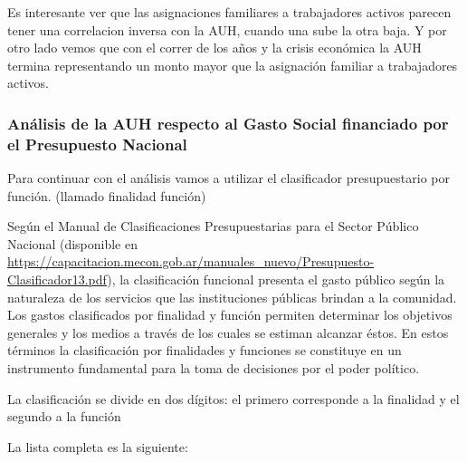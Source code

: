 \documentclass[
  12,
]{article}
\begin{document}
Es interesante ver que las asignaciones familiares a trabajadores
activos parecen tener una correlacion inversa con la AUH, cuando una
sube la otra baja. Y por otro lado vemos que con el correr de los años y
la crisis económica la AUH termina representando un monto mayor que la
asignación familiar a trabajadores activos.

\hypertarget{anuxe1lisis-de-la-auh-respecto-al-gasto-social-financiado-por-el-presupuesto-nacional}{%
\subsubsection{Análisis de la AUH respecto al Gasto Social financiado
por el Presupuesto
Nacional}\label{anuxe1lisis-de-la-auh-respecto-al-gasto-social-financiado-por-el-presupuesto-nacional}}

Para continuar con el análisis vamos a utilizar el clasificador
presupuestario por función. (llamado finalidad función)

Según el Manual de Clasificaciones Presupuestarias para el Sector
Público Nacional (disponible en
\url{https://capacitacion.mecon.gob.ar/manuales_nuevo/Presupuesto-Clasificador13.pdf}),
la clasificación funcional presenta el gasto público según la naturaleza
de los servicios que las instituciones públicas brindan a la comunidad.
Los gastos clasificados por finalidad y función permiten determinar los
objetivos generales y los medios a través de los cuales se estiman
alcanzar éstos. En estos términos la clasificación por finalidades y
funciones se constituye en un instrumento fundamental para la toma de
decisiones por el poder político.

La clasificación se divide en dos dígitos: el primero corresponde a la
finalidad y el segundo a la función

La lista completa es la siguiente:
\end{document}
